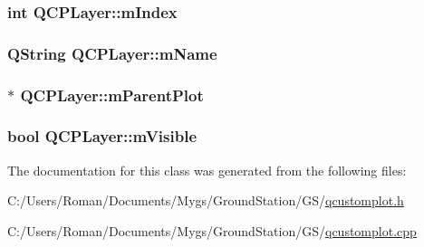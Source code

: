 \subsubsection[{m\+Index}]{\setlength{\rightskip}{0pt plus 5cm}int Q\+C\+P\+Layer\+::m\+Index\hspace{0.3cm}{\ttfamily [protected]}}\label{class_q_c_p_layer_a122088bcab6cec76a52b75ce8606605b}
\hypertarget{class_q_c_p_layer_a91e6298183cb4b9dfd4efdfaf1ecc220}{}
\subsubsection[{m\+Name}]{\setlength{\rightskip}{0pt plus 5cm}Q\+String Q\+C\+P\+Layer\+::m\+Name\hspace{0.3cm}{\ttfamily [protected]}}\label{class_q_c_p_layer_a91e6298183cb4b9dfd4efdfaf1ecc220}
\hypertarget{class_q_c_p_layer_a2f3374a7884bf403720cd1cf6f7ad1bb}{}
\subsubsection[{m\+Parent\+Plot}]{$\ast$ Q\+C\+P\+Layer\+::m\+Parent\+Plot\hspace{0.3cm}{\ttfamily [protected]}}\label{class_q_c_p_layer_a2f3374a7884bf403720cd1cf6f7ad1bb}
\hypertarget{class_q_c_p_layer_a264950deb08e589460c126c895a1e2b5}{}
\subsubsection[{m\+Visible}]{\setlength{\rightskip}{0pt plus 5cm}bool Q\+C\+P\+Layer\+::m\+Visible\hspace{0.3cm}{\ttfamily [protected]}}\label{class_q_c_p_layer_a264950deb08e589460c126c895a1e2b5}


The documentation for this class was generated from the following files\+:\begin{DoxyCompactItemize}
\item 
C\+:/\+Users/\+Roman/\+Documents/\+Mygs/\+Ground\+Station/\+G\+S/\hyperlink{qcustomplot_8h}{qcustomplot.\+h}\item 
C\+:/\+Users/\+Roman/\+Documents/\+Mygs/\+Ground\+Station/\+G\+S/\hyperlink{qcustomplot_8cpp}{qcustomplot.\+cpp}\end{DoxyCompactItemize}
